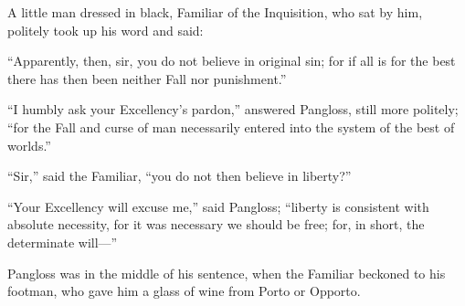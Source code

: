 A little man dressed in black, Familiar of the Inquisition, who sat by him, politely took up his word and said:

``Apparently, then, sir, you do not believe in original sin; for if all is for the best there has then been neither Fall nor punishment.''

``I humbly ask your Excellency's pardon,'' answered Pangloss, still more politely; ``for the Fall and curse of man necessarily entered into the system of the best of worlds.''

``Sir,'' said the Familiar, ``you do not then believe in liberty?''

``Your Excellency will excuse me,'' said Pangloss; ``liberty is consistent with absolute necessity, for it was necessary we should be free; for, in short, the determinate will---''

Pangloss was in the middle of his sentence, when the Familiar beckoned to his footman, who gave him a glass of wine from Porto or Opporto.

